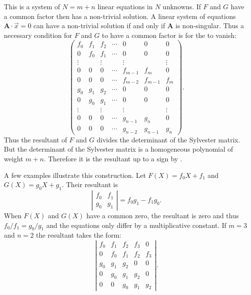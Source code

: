 This is a system of $N = m+n$ linear equations in $N$
unknowns.  If $F$ and $G$ have a  common factor then
 has a non-trivial solution.  A linear system
of equations $\mathbf{A}\cdot \vec{x} = 0$ can have a non-trivial solution
if and only if $\mathbf{A}$ is non-singular.  Thus a necessary condition
for $F$ and $G$ to have a common factor is for the  to vanish:
\begin{equation}
\begin{pmatrix}
f_0 & f_1 & f_2 &\cdots & 0 & 0 & 0 \\
0 & f_0 & f_1 & \cdots & 0 & 0 & 0 \\
\vdots& & \vdots & & \vdots & & \vdots \\
0 & 0 & 0 & \cdots & f_{m-1} & f_m & 0 \\
0 & 0 & 0 & \cdots & f_{m-2} & f_{m-1} & f_m \\
g_0 & g_1 & g_2 &\cdots & 0 & 0 & 0 \\
0 & g_0 & g_1 & \cdots & 0 & 0 & 0 \\
\vdots& & \vdots & & \vdots & & \vdots \\
0 & 0 & 0 & \cdots & g_{n-1} & g_n & 0 \\
0 & 0 & 0 & \cdots & g_{n-2} & g_{n-1} & g_n \end{pmatrix}. 
\label{Sylvester:Matrix:Eq}
\end{equation}
Thus the resultant of $F$ and $G$ divides the determinant of the
Sylvester matrix.  But the determinant of the Sylvester matrix is a
homogeneous polynomial of weight $m+n$.  Therefore it is the resultant
up to a sign by .

A few examples illustrate this construction.  Let $F(X) = f_0 X + f_1$
and $G(X) = g_0 X + g_1$.  Their resultant is
\[
\left|
  \begin{array}{cc} 
    f_{0} & f_{1} \\
    g_{0} & g_{1} 
  \end{array}
\right| = f_{0} g_{1} - f_{1} g_{0}.
\]
When $F(X)$ and $G(X)$ have a common zero, the resultant is zero and thus
$f_{0}/f_{1} = g_{0}/g_{1}$ and the equations only differ by a
multiplicative constant.  If $m = 3$ and $n= 2$ the resultant takes the
form:
\[
\left|
  \begin{array}{ccccc} 
    f_{0} & f_{1} & f_{2} & f_{3} & 0 \\
    0 & f_{0} & f_{1} & f_{2} & f_{3} \\
    g_{0} & g_{1} & g_{2} & 0 & 0 \\
    0 & g_{0} & g_{1} & g_{2} & 0 \\
    0 & 0 & g_{0} & g_{1} & g_{2} \end{array} \right|.
\]

